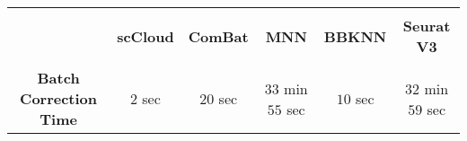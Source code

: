\documentclass{article}
\begin{document}
\begin{center}
\begin{tabular}{|c|c|c|c|c|c|}\hline
& & & & & \\[-10pt]
 & \textbf{scCloud} & \textbf{ComBat} & \textbf{MNN} & \textbf{BBKNN} & \textbf{Seurat V3}\\[2pt]\hline
 & & & & & \\[-10pt]
 \textbf{Batch Correction Time} & $2$ sec & $20$ sec & $33$ min $55$ sec & $10$ sec & $32$ min $59$ sec  \\[2pt]\hline
\end{tabular}
\end{center}
\end{document}
